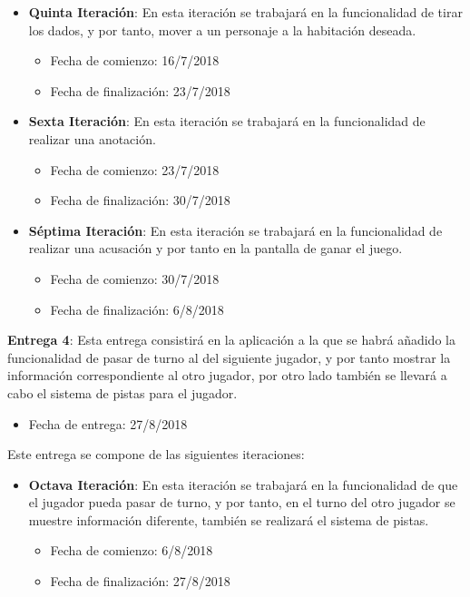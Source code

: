 \begin{itemize}
  \item \textbf{Quinta Iteración}: En esta iteración se trabajará en la funcionalidad de tirar los dados, y por tanto, mover a un personaje a la habitación deseada.

  \begin{itemize}
    \item Fecha de comienzo: 16/7/2018
    \item Fecha de finalización: 23/7/2018
  \end{itemize}

  \item \textbf{Sexta Iteración}: En esta iteración se trabajará en la funcionalidad de realizar una anotación.

  \begin{itemize}
    \item Fecha de comienzo: 23/7/2018
    \item Fecha de finalización: 30/7/2018
  \end{itemize}

  \item \textbf{Séptima Iteración}: En esta iteración se trabajará en la funcionalidad de realizar una acusación y por tanto en la pantalla de ganar el juego.

  \begin{itemize}
    \item Fecha de comienzo: 30/7/2018
    \item Fecha de finalización: 6/8/2018
  \end{itemize}
\end{itemize}

\hfill

\textbf{Entrega 4}: Esta entrega consistirá en la aplicación a la que se habrá añadido la funcionalidad de pasar de turno al del siguiente jugador, y por tanto mostrar la información correspondiente al otro jugador, por otro lado también se llevará a cabo el sistema de pistas para el jugador.

\begin{itemize}
  \item Fecha de entrega: 27/8/2018
\end{itemize}

\hfill

Este entrega se compone de las siguientes iteraciones:

\begin{itemize}
  \item \textbf{Octava Iteración}:  En esta iteración se trabajará en la funcionalidad de que el jugador pueda pasar de turno, y por tanto, en el turno del otro jugador se muestre información diferente, también se realizará el sistema de pistas.

  \begin{itemize}
    \item Fecha de comienzo: 6/8/2018
    \item Fecha de finalización: 27/8/2018
  \end{itemize}
\end{itemize}

